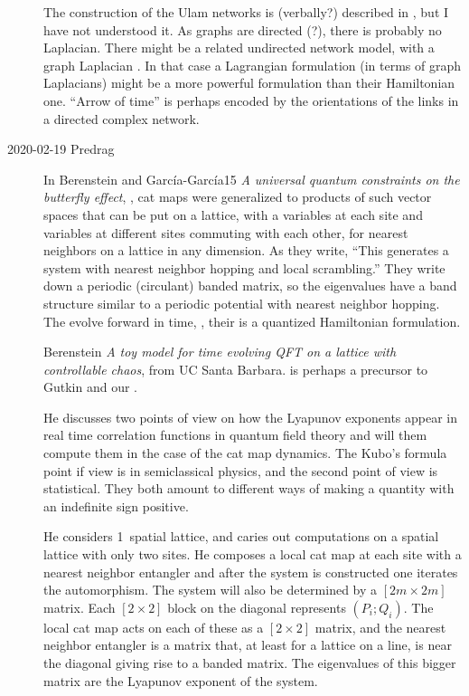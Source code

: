 \begin{description}
{The construction of the Ulam networks is (verbally?) described in
, but I have not understood it. As graphs are directed (?),
there is probably no Laplacian. There might be a related undirected network
model, with a graph Laplacian . In that case a Lagrangian
formulation (in terms of graph Laplacians) might be a more powerful formulation
than their Hamiltonian one. ``Arrow of time'' is perhaps encoded by the
orientations of the links in a directed complex network.
    }


\item[2020-02-19 Predrag]
In
Berenstein and Garc{\'i}a-Garc{\'i}a15
{\em A universal quantum constraints on the butterfly effect},
,
cat maps were generalized to products of such vector spaces that can be
put on a lattice, with a variables at each site and variables at
different sites commuting with each other, for nearest neighbors on a
lattice in any dimension. As they write, ``This generates a system with
nearest neighbor hopping and local scrambling.'' They write down a
periodic (circulant) banded matrix, so the  eigenvalues have a band
structure similar to a periodic potential with nearest neighbor hopping.
The evolve forward in time, \ie, their is a quantized Hamiltonian
formulation.

Berenstein
{\em A toy model for time evolving QFT on a lattice with controllable chaos},
 from UC Santa Barbara.
is perhaps a precursor to Gutkin and our \catlatt.

He discusses two points of view on how the Lyapunov exponents appear in
real time correlation functions in quantum field theory and will them
compute them in the case of the cat map dynamics. The Kubo's formula
point if view is in semiclassical physics, and the second point of view
is statistical. They both amount to different ways of making a quantity
with an indefinite sign positive.

He considers 1\dmn\ spatial lattice, and caries out computations on a
spatial lattice with only two sites. He composes a local cat map at each
site with a nearest neighbor entangler and after the system is
constructed one iterates the automorphism. The system will also be
determined by a $[2m\times 2m]$ matrix. Each $[2\times 2]$ block on the
diagonal represents $(P_i;Q_i)$. The local cat map acts on each of these
as a $[2\times 2]$ matrix, and the nearest neighbor entangler is a matrix
that, at least for a lattice on a line, is near the diagonal giving rise
to a banded matrix. The eigenvalues of this bigger matrix are the
Lyapunov exponent of the system.


\end{description}
